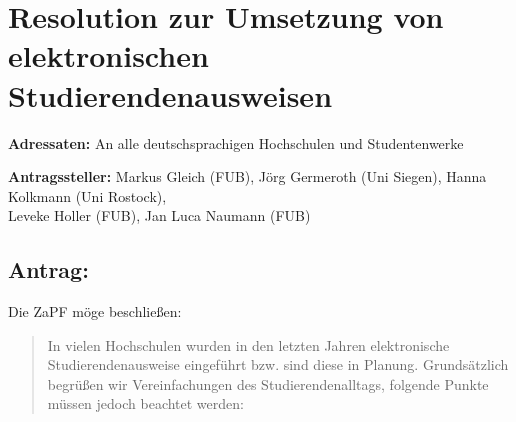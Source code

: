 \documentclass[10pt,oneside]{scrartcl}
\begin{document}
\section*{Resolution zur Umsetzung von elektronischen Studierendenausweisen}

\textbf{Adressaten:} An alle deutschsprachigen Hochschulen und Studentenwerke

\textbf{Antragssteller:} Markus Gleich (FUB), Jörg Germeroth (Uni Siegen), Hanna Kolkmann (Uni Rostock), \\ Leveke Holler (FUB), Jan Luca Naumann (FUB)

\subsection*{Antrag:}
Die ZaPF möge beschließen:
\begin{quote}
  In vielen Hochschulen wurden in den letzten Jahren elektronische Studierendenausweise eingeführt bzw. sind diese in Planung. Grundsätzlich begrüßen wir Vereinfachungen des Studierendenalltags, folgende Punkte  müssen jedoch beachtet werden:


\end{quote}
\end{document}
